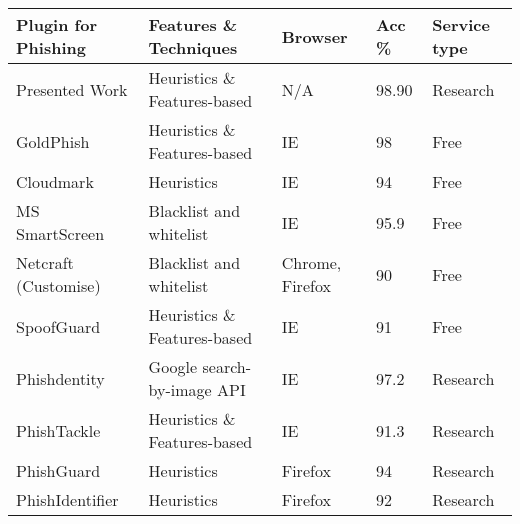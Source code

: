 \begin{singlespace}
    \small
    \begin{center}
        \label{tab:EXISTENT_SOLUTIONS_VS_ARTEFACT}
        \begin{tabular}{ | m{8em} | m{13em} | m{8.5em} | m{2.3em} | m{5em} | }
            \hline
            \textbf{Plugin for Phishing} & \textbf{Features \& Techniques}       & \textbf{Browser}    & \textbf{Acc \%} & \textbf{Service  type} \\
            \hline
            Presented Work               & Heuristics \& Features-based          & N/A                 & 98.90           & Research               \\
            \hline
            GoldPhish                    & Heuristics \& Features-based          & IE                  & 98              & Free                   \\
            \hline
            Cloudmark                    & Heuristics                            & IE                  & 94              & Free                   \\
            \hline
            MS SmartScreen               & Blacklist and whitelist               & IE                  & 95.9            & Free                   \\
            \hline
            Netcraft (Customise)         & Blacklist and whitelist               & Chrome, Firefox     & 90              & Free                   \\
            \hline
            SpoofGuard                   & Heuristics \& Features-based          & IE                  & 91              & Free                   \\
            \hline
            Phishdentity                 & Google search-by-image API            & IE                  & 97.2            & Research               \\
            \hline
            PhishTackle                  & Heuristics \& Features-based          & IE                  & 91.3            & Research               \\
            \hline
            PhishGuard                   & Heuristics                            & Firefox             & 94              & Research               \\
            \hline
            PhishIdentifier              & Heuristics                            & Firefox             & 92              & Research               \\
            \hline

\end{tabular}
\end{center}
\end{singlespace}
